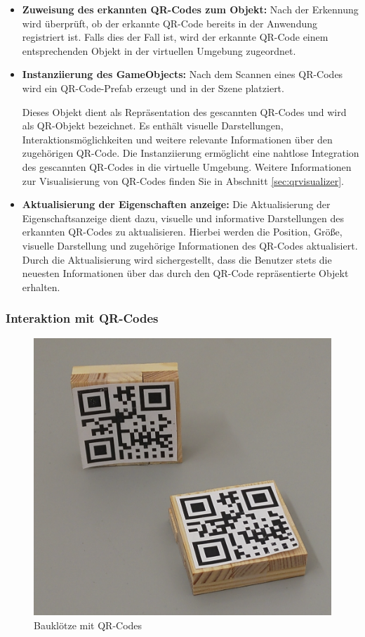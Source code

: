 \begin{itemize}
\item \textbf{Zuweisung des erkannten QR-Codes zum Objekt:}
Nach der Erkennung wird überprüft, ob der erkannte QR-Code bereits in der Anwendung registriert ist. Falls dies der Fall
ist, wird der erkannte QR-Code einem entsprechenden Objekt in der virtuellen Umgebung zugeordnet.

\item \textbf{Instanziierung des GameObjects:}
Nach dem Scannen eines QR-Codes wird ein QR-Code-Prefab erzeugt und in der Szene platziert.

Dieses Objekt dient als Repräsentation des gescannten QR-Codes und wird als QR-Objekt bezeichnet. Es enthält visuelle
Darstellungen, Interaktionsmöglichkeiten und weitere relevante Informationen über den zugehörigen QR-Code. Die Instanziierung
ermöglicht eine nahtlose Integration des gescannten QR-Codes in die virtuelle Umgebung. Weitere Informationen zur Visualisierung
von QR-Codes finden Sie in Abschnitt \ref{sec:qrvisualizer}.

\item \textbf{Aktualisierung der Eigenschaften anzeige:}
Die Aktualisierung der Eigenschaftsanzeige dient dazu, visuelle und informative Darstellungen des erkannten QR-Codes zu
aktualisieren. Hierbei werden die Position, Größe, visuelle Darstellung und zugehörige Informationen des QR-Codes aktualisiert.
Durch die Aktualisierung wird sichergestellt, dass die Benutzer stets die neuesten Informationen über das durch den QR-Code
repräsentierte Objekt erhalten.

\end{itemize}

\subsubsection{Interaktion mit QR-Codes}
\begin{figure}[H]
\centering
\includegraphics[scale=0.3, angle=0]{images/bauklotz}
\caption{Bauklötze mit QR-Codes}
\label{fig:bauklotz}
\end{figure}

